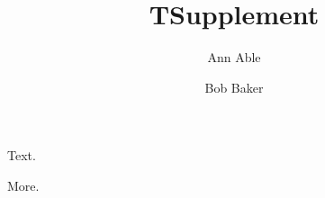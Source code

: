 \documentclass{revtex4-2}
\begin{document}
\title{T}
\author{Ann Able}
\maketitle
Text.
\title{Supplement}
\author{Bob Baker}
\maketitle
More.
\end{document}
